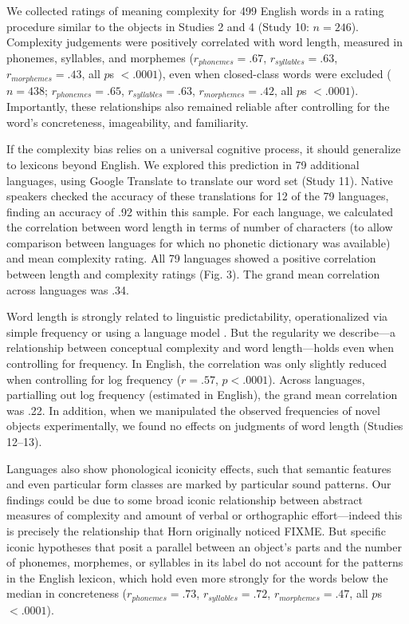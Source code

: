 \documentclass[12pt]{article}
\begin{document}
We collected ratings of meaning complexity for 499 English words in a rating procedure similar to the objects in Studies 2 and 4 (Study 10: $n = 246$). Complexity judgements were positively correlated with word length, measured in phonemes, syllables, and morphemes ($r_{phonemes} = .67$, $r_{syllables} = .63$, $r_{morphemes} = .43$, all $p$s $< .0001$), even when closed-class words were excluded ($n = 438$; $r_{phonemes} = .65$, $r_{syllables} = .63$, $r_{morphemes} = .42$, all $p$s $< .0001$). Importantly, these relationships also remained reliable after controlling for the word's concreteness, imageability, and familiarity. 
						
If the complexity bias relies on a universal cognitive process, it should generalize to lexicons beyond English. We explored this prediction in 79 additional languages, using Google Translate to translate our word set (Study 11). Native speakers checked the accuracy of these translations for 12 of the 79 languages, finding an accuracy of .92 within this sample. For each language, we calculated the correlation between word length in terms of number of characters (to allow comparison between languages for which no phonetic dictionary was available) and mean complexity rating. All 79 languages showed a positive correlation between length and complexity ratings (Fig. 3). The grand mean correlation across languages was .34. 
					

Word length is strongly related to linguistic predictability, operationalized via simple frequency \cite{zipf1936} or using a language model \cite{piantadosi2011a}. But the regularity we describe---a relationship between conceptual complexity and word length---holds even when controlling for frequency. In English, the correlation was only slightly reduced when controlling for log frequency ($r = .57$, $p < .0001$). Across languages, partialling out log frequency (estimated in English), the grand mean correlation was .22. In addition, when we manipulated the observed frequencies of novel objects experimentally, we found no effects on judgments of word length (Studies 12--13). 

Languages also show phonological iconicity effects, such that semantic features \cite{maurer2006shape} and even particular form classes \cite{farmer2006phonological} are marked by particular sound patterns. Our findings could be due to some broad iconic relationship between abstract measures of complexity and amount of verbal or orthographic effort---indeed this is precisely the relationship that Horn originally noticed FIXME. But specific iconic hypotheses that posit a parallel between an object's parts and the number of phonemes, morphemes, or syllables in its label do not account for the patterns in the English lexicon, which hold even more strongly for the words below the median in concreteness ($r_{phonemes}= .73$, $r_{syllables} = .72$, $r_{morphemes} = .47$, all $p$s $< .0001$). 
\end{document}
